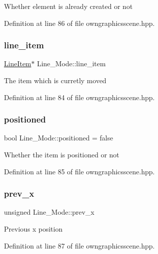 Whether element is already created or not 

Definition at line 86 of file owngraphicsscene.\+hpp.

\mbox{\label{structLine__Mode_a4e11b31f28505579f3dfcde54b27ecac}} 
\subsubsection{\texorpdfstring{line\+\_\+item}{line\_item}}
{\footnotesize\ttfamily \mbox{\hyperlink{classLineItem}{Line\+Item}}$\ast$ Line\+\_\+\+Mode\+::line\+\_\+item}

The item which is curretly moved 

Definition at line 84 of file owngraphicsscene.\+hpp.

\mbox{\label{structLine__Mode_aefbb8555f406d47d742491003a6afde1}} 
\subsubsection{\texorpdfstring{positioned}{positioned}}
{\footnotesize\ttfamily bool Line\+\_\+\+Mode\+::positioned = false}

Whether the item is positioned or not 

Definition at line 85 of file owngraphicsscene.\+hpp.

\mbox{\label{structLine__Mode_a8bbcbaff29a7810e066e99174e562371}} 
\subsubsection{\texorpdfstring{prev\+\_\+x}{prev\_x}}
{\footnotesize\ttfamily unsigned Line\+\_\+\+Mode\+::prev\+\_\+x}

Previous x position 

Definition at line 87 of file owngraphicsscene.\+hpp.

\mbox{\label{structLine__Mode_a8d5fb940f686955ead3f368a8d3b9016}} 
